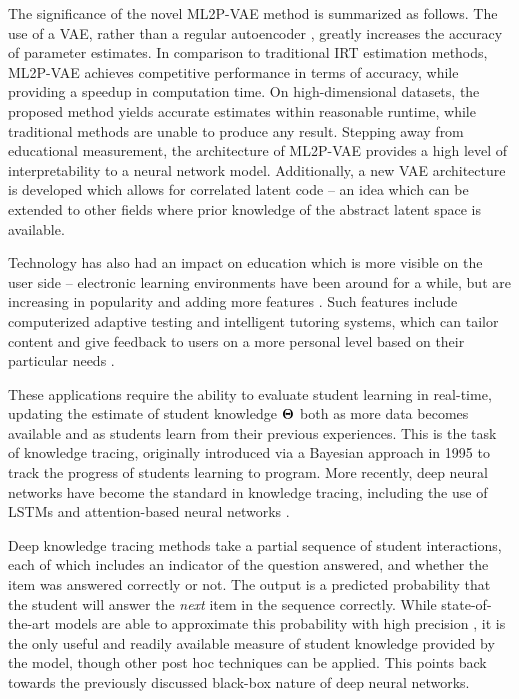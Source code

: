 The significance of the novel ML2P-VAE method is summarized as follows. The use of a VAE, rather than a regular autoencoder \cite{guo2017}, greatly increases the accuracy of parameter estimates. In comparison to traditional IRT estimation methods, ML2P-VAE achieves competitive performance in terms of accuracy, while providing a speedup in computation time. On high-dimensional datasets, the proposed method yields accurate estimates within reasonable runtime, while traditional methods are unable to produce any result. Stepping away from educational measurement, the architecture of ML2P-VAE provides a high level of interpretability to a neural network model. Additionally, a new VAE architecture is developed which allows for correlated latent code -- an idea which can be extended to other fields where prior knowledge of the abstract latent space is available.

Technology has also had an impact on education which is more visible on the user side -- electronic learning environments have been around for a while, but are increasing in popularity and adding more features \cite{epcal, act_academy}. Such features include computerized adaptive testing and intelligent tutoring systems, which can tailor content and give feedback to users on a more personal level based on their particular needs \cite{meijer1999, ong2003}.

These applications require the ability to evaluate student learning in real-time, updating the estimate of student knowledge $\boldsymbol{\Theta}$ both as more data becomes available and as students learn from their previous experiences. This is the task of knowledge tracing, originally introduced via a Bayesian approach in 1995 \cite{corbett1995} to track the progress of students learning to program. More recently, deep neural networks have become the standard in knowledge tracing, including the use of LSTMs \cite{piech2015} and attention-based neural networks \cite{pandey2019}.

Deep knowledge tracing methods take a partial sequence of student interactions, each of which includes an indicator of the question answered, and whether the item was answered correctly or not. The output is a predicted probability that the student will answer the \textit{next} item in the sequence correctly. While state-of-the-art models are able to approximate this probability with high precision \cite{zhang2017}, it is the only useful and readily available measure of student knowledge provided by the model, though other post hoc techniques can be applied. This points back towards the previously discussed black-box nature of deep neural networks.

